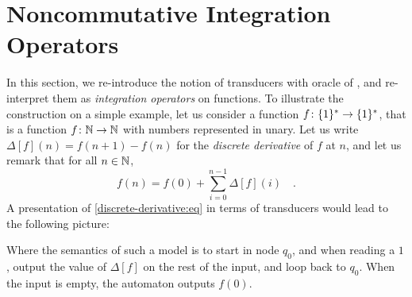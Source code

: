 \documentclass[11pt]{article}
\begin{document}
\section{Noncommutative Integration Operators}
\label{noncommutative-integration:sec}

In this section, we re-introduce the notion of transducers with oracle of
\cite{CDTL23}, and re-interpret them as \emph{integration operators} on
functions. To illustrate the construction on a simple example, let us consider
a function $f \colon \{ 1 \}^* \to \{ 1 \}^*$, that is a function $f \colon
\mathbb{N} \to \mathbb{N}$ with numbers represented in unary.
Let us write $\Delta[f] (n) = f(n+1) - f(n)$ for the \emph{discrete derivative}
of $f$ at $n$, and let us remark that for all $n \in \mathbb{N}$,
\begin{equation}
    \label{discrete-derivative:eq}
    f(n) = f(0) + \sum_{i=0}^{n-1} \Delta[f](i)
    \quad .
\end{equation}
A presentation of \cref{discrete-derivative:eq} in terms of transducers
would lead to the following picture:
\begin{center}
\end{center}
Where the semantics of such a model is to
start in node $q_0$, and when reading a $1$, output the value of $\Delta[f]$
on the rest of the input, and loop back to $q_0$. When the input is empty, the
automaton outputs $f(0)$.
\end{document}

